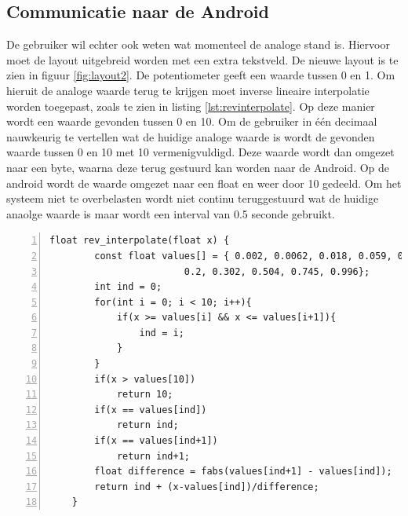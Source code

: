 \documentclass[a4paper]{article}
\begin{document}
		\subsection{Communicatie naar de Android}
			De gebruiker wil echter ook weten wat momenteel de analoge stand is. Hiervoor moet de layout uitgebreid worden met een extra tekstveld. De nieuwe layout is te zien in figuur \ref{fig:layout2}. De potentiometer geeft een waarde tussen 0 en 1. Om hieruit de analoge waarde terug te krijgen moet inverse lineaire interpolatie worden toegepast, zoals te zien in listing \ref{lst:revinterpolate}. Op deze manier wordt een waarde gevonden tussen 0 en 10. Om de gebruiker in \'e\'en decimaal nauwkeurig te vertellen wat de huidige analoge waarde is wordt de gevonden waarde tussen 0 en 10 met 10 vermenigvuldigd. Deze waarde wordt dan omgezet naar een byte, waarna deze terug gestuurd kan worden naar de Android. Op de android wordt de waarde omgezet naar een float en weer door 10 gedeeld. Om het systeem niet te overbelasten wordt niet continu teruggestuurd wat de huidige anaolge waarde is maar wordt een interval van 0.5 seconde gebruikt.
	\begin{lstlisting}[caption=Linear Interpolation, label=lst:revinterpolate, numbers=left]
	float rev_interpolate(float x) {
		const float values[] = { 0.002, 0.0062, 0.018, 0.059, 0.105, 0.152,
					    0.2, 0.302, 0.504, 0.745, 0.996};
		int ind = 0;
		for(int i = 0; i < 10; i++){
			if(x >= values[i] && x <= values[i+1]){
				ind = i;
			}
		}
		if(x > values[10])
			return 10;
		if(x == values[ind])
			return ind;
		if(x == values[ind+1])
			return ind+1;
		float difference = fabs(values[ind+1] - values[ind]);
		return ind + (x-values[ind])/difference;
	}
	\end{lstlisting}
\end{document}
